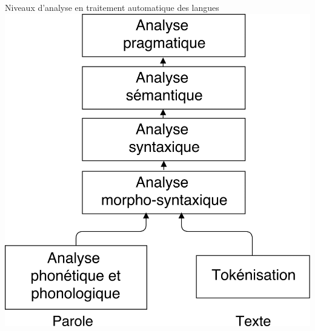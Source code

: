 \documentclass[french]{beamer}
\begin{document}
\begin{frame}{Niveaux d'analyse en traitement automatique des langues}
  \centering
  \includegraphics[scale=0.12]{figures/niveaux-0-trans.png}
\end{frame}
\end{document}
